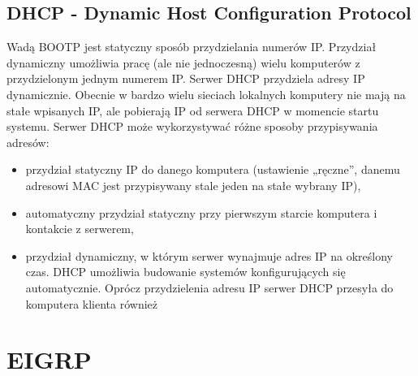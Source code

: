 \documentclass[a4paper]{article}
\begin{document}
\subsection{DHCP - Dynamic Host Configuration Protocol}
Wadą BOOTP jest statyczny sposób przydzielania numerów IP.
Przydział dynamiczny umożliwia pracę (ale nie jednoczesną) wielu komputerów z
przydzielonym jednym numerem IP.
Serwer DHCP przydziela adresy IP dynamicznie. Obecnie w bardzo wielu sieciach lokalnych
komputery nie mają na stałe wpisanych IP, ale pobierają IP od serwera DHCP w momencie
startu systemu.
Serwer DHCP może wykorzystywać różne sposoby przypisywania adresów:
\begin{itemize}
    \item przydział statyczny IP do danego komputera (ustawienie „ręczne”, danemu adresowi
MAC jest przypisywany stale jeden na stałe wybrany IP),
    \item automatyczny przydział statyczny przy pierwszym starcie komputera i kontakcie z
serwerem,
    \item przydział dynamiczny, w którym serwer wynajmuje adres IP na określony czas.
DHCP umożliwia budowanie systemów konfigurujących się automatycznie.
Oprócz przydzielenia adresu IP serwer DHCP przesyła do komputera klienta również 
\end{itemize}

\section{EIGRP}
\end{document}
